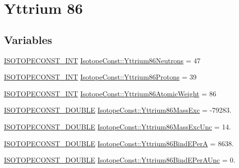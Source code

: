 \hypertarget{group___isotope_const-_yttrium-_y86}{}\section{Yttrium 86}
\label{group___isotope_const-_yttrium-_y86}
\subsection*{Variables}
\begin{DoxyCompactItemize}
\item 
\mbox{\hyperlink{group___isotope_const-_macros_ga5f18360b3e99483a35c32d789e62621c}{I\+S\+O\+T\+O\+P\+E\+C\+O\+N\+S\+T\+\_\+\+I\+NT}} \mbox{\hyperlink{group___isotope_const-_yttrium-_y86_ga85bb6ed918f0727a1d8cf16750375561}{Isotope\+Const\+::\+Yttrium86\+Neutrons}} = 47
\item 
\mbox{\hyperlink{group___isotope_const-_macros_ga5f18360b3e99483a35c32d789e62621c}{I\+S\+O\+T\+O\+P\+E\+C\+O\+N\+S\+T\+\_\+\+I\+NT}} \mbox{\hyperlink{group___isotope_const-_yttrium-_y86_gae549173a4289026a4a2f8bd5d953786c}{Isotope\+Const\+::\+Yttrium86\+Protons}} = 39
\item 
\mbox{\hyperlink{group___isotope_const-_macros_ga5f18360b3e99483a35c32d789e62621c}{I\+S\+O\+T\+O\+P\+E\+C\+O\+N\+S\+T\+\_\+\+I\+NT}} \mbox{\hyperlink{group___isotope_const-_yttrium-_y86_ga45510e216757dd4b854f8a43545f8237}{Isotope\+Const\+::\+Yttrium86\+Atomic\+Weight}} = 86
\item 
\mbox{\hyperlink{group___isotope_const-_macros_ga8f45a7272ce02c0b4c65c44636ed719a}{I\+S\+O\+T\+O\+P\+E\+C\+O\+N\+S\+T\+\_\+\+D\+O\+U\+B\+LE}} \mbox{\hyperlink{group___isotope_const-_yttrium-_y86_ga135fe4325bc703a9264024a281bf4b3d}{Isotope\+Const\+::\+Yttrium86\+Mass\+Exc}} = -\/79283.
\item 
\mbox{\hyperlink{group___isotope_const-_macros_ga8f45a7272ce02c0b4c65c44636ed719a}{I\+S\+O\+T\+O\+P\+E\+C\+O\+N\+S\+T\+\_\+\+D\+O\+U\+B\+LE}} \mbox{\hyperlink{group___isotope_const-_yttrium-_y86_gabe75a7c84a202794952540f11a058a21}{Isotope\+Const\+::\+Yttrium86\+Mass\+Exc\+Unc}} = 14.
\item 
\mbox{\hyperlink{group___isotope_const-_macros_ga8f45a7272ce02c0b4c65c44636ed719a}{I\+S\+O\+T\+O\+P\+E\+C\+O\+N\+S\+T\+\_\+\+D\+O\+U\+B\+LE}} \mbox{\hyperlink{group___isotope_const-_yttrium-_y86_ga1bb085b184fe99d72818288db0fbddc8}{Isotope\+Const\+::\+Yttrium86\+Bind\+E\+PerA}} = 8638.
\item 
\mbox{\hyperlink{group___isotope_const-_macros_ga8f45a7272ce02c0b4c65c44636ed719a}{I\+S\+O\+T\+O\+P\+E\+C\+O\+N\+S\+T\+\_\+\+D\+O\+U\+B\+LE}} \mbox{\hyperlink{group___isotope_const-_yttrium-_y86_ga03561fc433bf38dc3baea3ab0555b3f6}{Isotope\+Const\+::\+Yttrium86\+Bind\+E\+Per\+A\+Unc}} = 0.

\end{DoxyCompactItemize}
